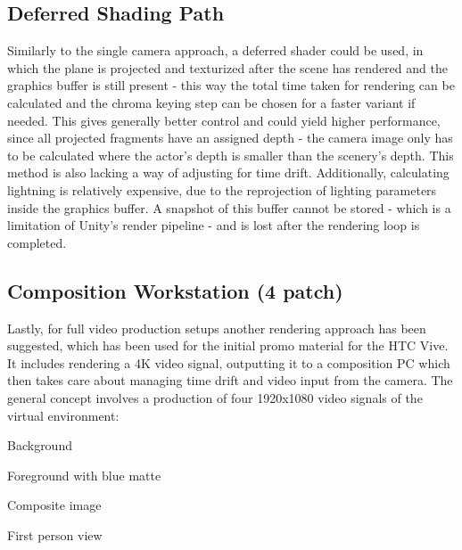 \subsection{Deferred Shading Path}

Similarly to the single camera approach, a deferred shader could be used, in 
which the plane is projected and texturized after the scene has rendered and 
the graphics buffer is still present - this way the total time taken for 
rendering can be calculated and the chroma keying step can be chosen for a 
faster variant if needed. This gives generally better control and could yield 
higher performance, since all projected fragments have an assigned depth - the 
camera image only has to be calculated where the actor's depth is smaller than 
the scenery's depth. This method is also lacking a way of adjusting for time 
drift. Additionally, calculating lightning is relatively expensive, due to the 
reprojection of lighting parameters inside the graphics buffer. A snapshot of 
this buffer cannot be stored - which is a limitation of Unity's render pipeline 
- and is lost after the rendering loop is completed.

\subsection{Composition Workstation (4 patch)}

Lastly, for full video production setups another rendering approach has been 
suggested, which has been used for the initial promo material for the HTC 
Vive\cite{valve:vive-trailer:2016}. It includes rendering a 4K video signal, 
outputting it to a composition PC which then takes care about managing time 
drift and video input from the camera.
\newline
The general concept involves a production of four 1920x1080 video signals of 
the virtual environment:
\begin{my_list}
	\item Background
	\item Foreground with blue matte
	\item Composite image
	\item First person view
\end{my_list}


